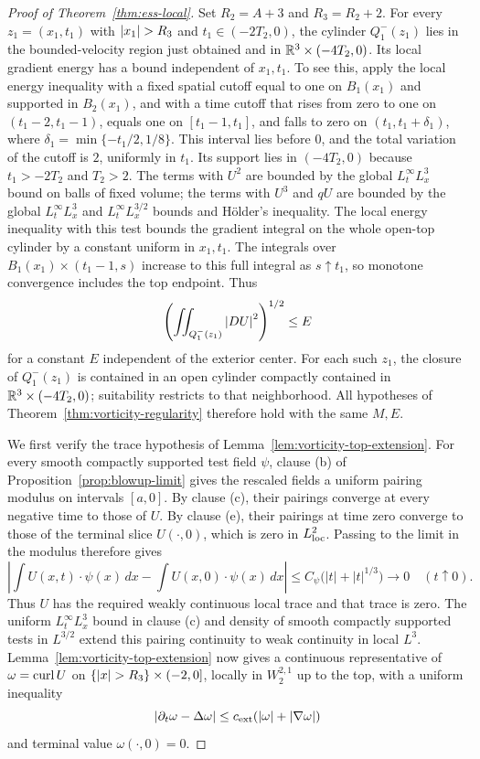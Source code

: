 \documentclass[11pt,letterpaper]{article}
\numberwithin{equation}{section}
\theoremstyle{plain}
\theoremstyle{definition}
\theoremstyle{remark}
\begin{document}
\begin{proof}[Proof of Theorem~\ref{thm:ess-local}]
Set $R_2=A+3$ and $R_3=R_2+2$. For every
$z_1=(x_1,t_1)$ with $\left\lvert x_1\right\rvert>R_3$ and $t_1\in(-2T_2,0)$, the
cylinder $Q_1^-(z_1)$ lies in the bounded-velocity region just obtained and
in $\mathbb{R}^3\times(-4T_2,0)$. Its local gradient energy has a bound independent
of $x_1,t_1$. To see this, apply the local energy inequality with a fixed
spatial cutoff equal to one on $B_1(x_1)$ and supported in $B_2(x_1)$, and
with a time cutoff that rises from zero to one on $(t_1-2,t_1-1)$,
equals one on $[t_1-1,t_1]$, and falls to zero on
$(t_1,t_1+\delta_1)$, where
$\delta_1=\min\{-t_1/2,1/8\}$. This interval lies before $0$, and the
total variation of the cutoff is $2$, uniformly in $t_1$. Its support lies
in $(-4T_2,0)$ because $t_1>-2T_2$ and $T_2>2$. The terms with $U^2$ are
bounded by the global $L^\infty_tL^3_x$ bound on balls of fixed volume; the
terms with $U^3$ and $qU$ are bounded by the global $L^\infty_tL^3_x$ and
$L^\infty_tL^{3/2}_x$ bounds and H\"older's inequality. The local energy
inequality with this test bounds the gradient integral on the whole open-top
cylinder by a constant uniform in $x_1,t_1$. The integrals over
$B_1(x_1)\times(t_1-1,s)$ increase to this full integral as $s\uparrow t_1$,
so monotone convergence includes the top endpoint. Thus
\[
 \left(\iint_{Q_1^-(z_1)}\left\lvert DU\right\rvert^2\right)^{1/2}\le E
\]
for a constant $E$ independent of the exterior center. For each such
$z_1$, the closure of $Q_1^-(z_1)$ is contained in an open cylinder compactly
contained in $\mathbb{R}^3\times(-4T_2,0)$; suitability restricts to that
neighborhood. All hypotheses of Theorem~\ref{thm:vorticity-regularity}
therefore hold with the same $M,E$.

We first verify the trace hypothesis of Lemma~\ref{lem:vorticity-top-extension}.
For every smooth compactly supported test field $\psi$, clause (b) of
Proposition~\ref{prop:blowup-limit} gives the rescaled fields a uniform
pairing modulus on intervals $[a,0]$. By clause (c), their pairings
converge at every negative time to those of $U$. By clause (e), their
pairings at time zero converge to those of the terminal slice $U(\cdot,0)$,
which is zero in $L^2_{\rm loc}$. Passing to the limit in the modulus
therefore gives
\[
 \left|\int U(x,t)\cdot\psi(x)\,dx
       -\int U(x,0)\cdot\psi(x)\,dx\right|
 \le C_\psi\bigl(|t|+|t|^{1/3}\bigr)\longrightarrow0
 \quad(t\uparrow0).
\]
Thus $U$ has the required weakly continuous local trace and that trace is
zero. The uniform $L^\infty_tL^3_x$ bound in clause (c) and density of
smooth compactly supported tests in $L^{3/2}$ extend this pairing
continuity to weak continuity in local $L^3$. Lemma~\ref{lem:vorticity-top-extension}
now gives a continuous
representative of $\omega=\operatorname{curl} U$ on
$\{\left\lvert x\right\rvert>R_3\}\times(-2,0]$, locally in $W^{2,1}_2$ up to the top, with
a uniform inequality
\[
 \left\lvert \partial_t\omega-\Delta\omega\right\rvert
 \le c_{\rm ext}(\left\lvert \omega\right\rvert+\left\lvert \nabla\omega\right\rvert)
\]
and terminal value $\omega(\cdot,0)=0$.


\end{proof}
\end{document}
